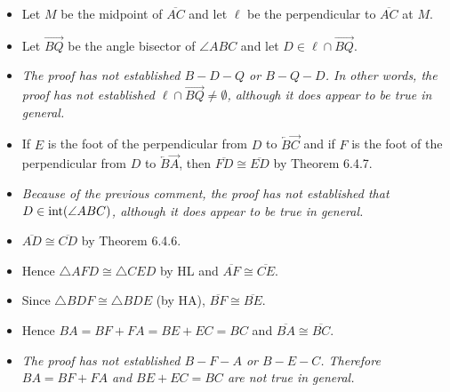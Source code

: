 \documentclass[12pt,openany]{report}
\begin{document}
\begin{itemize}

\item[]
Let $M$ be the midpoint of $\overline{AC}$ and let $\ell$ be the perpendicular
to $\overline{AC}$ at $M$.

\item[]
Let $\overrightarrow{BQ}$ be the angle bisector of $\angle ABC$ and let
$D\in\ell\cap\overrightarrow{BQ}$.

\item
{\it The proof has not established $B{-}D{-}Q$ or $B{-}Q{-}D$.
In other words, the proof has not established $\ell\cap\overrightarrow{BQ}\ne\emptyset$,
although it does appear to be true in general.}

\item[]
If $E$ is the foot of the perpendicular from $D$ to $\overleftarrow B \overrightarrow C$
and if $F$ is the foot of the perpendicular from $D$ to $\overleftarrow B\overrightarrow A$,
then $\overline{FD}\cong\overline{ED}$ by Theorem 6.4.7.

\item
{\it Because of the previous comment, the proof has not established that
$D\in\mathop{\rm int}(\angle ABC)$, although it does appear to be true
in general.}

\item[]
$\overline{AD}\cong\overline{CD}$ by Theorem 6.4.6.

\item[]
Hence $\triangle AFD\cong\triangle CED$ by HL and $\overline{AF}\cong\overline{CE}$.

\item[]
Since $\triangle BDF\cong\triangle BDE$ (by HA), $\overline{BF}\cong\overline{BE}$.

\item[]
Hence $BA=BF+FA=BE+EC=BC$ and $\overline{BA}\cong\overline{BC}$.

\item
{\it The proof has not established $B{-}F{-}A$ or $B{-}E{-}C$.
Therefore $BA=BF+FA$ and $BE+EC=BC$ are not true in general.}

\end{itemize}
\end{document}
